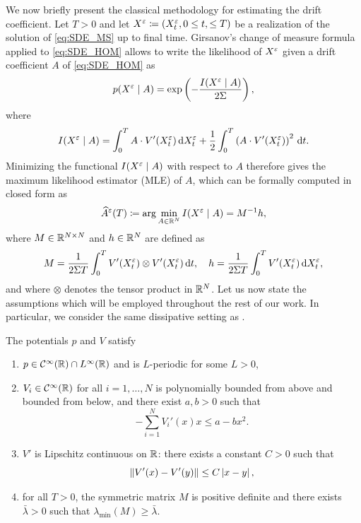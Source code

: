 \documentclass[10pt]{article}
\begin{document}
We now briefly present the classical methodology for estimating the drift coefficient. Let $T > 0$ and let $X^\varepsilon \coloneqq (X^\varepsilon_t, 0\leq t, \leq T)$ be a realization of the solution of \eqref{eq:SDE_MS} up to final time. Girsanov's change of measure formula applied to \eqref{eq:SDE_HOM} allows to write the likelihood of $X^\varepsilon$ given a drift coefficient $A$ of \eqref{eq:SDE_HOM} as
\begin{equation}\label{eq:Likelihood}
p(X^\varepsilon \mid A) = \exp\left(-\frac{I(X^\varepsilon\mid A)}{2\Sigma} \right), 
\end{equation}
where 
\begin{equation}
I(X^\varepsilon \mid A) = \int_0^T A \cdot V'(X^\varepsilon_t) \,\mathrm{d} X^\varepsilon_t + \frac12 \int_0^T \left( A \cdot V'(X^\varepsilon_t) \right)^2 \,\mathrm{d} t.
\end{equation}
Minimizing the functional $I(X^\varepsilon \mid A)$ with respect to $A$ therefore gives the maximum likelihood estimator (MLE) of $A$, which can be formally computed in closed form as
\begin{equation}\label{eq:MLE}
	\widehat A^\varepsilon(T) \coloneqq \arg \min_{A \in \mathbb{R}^N} I(X^\varepsilon \mid A) = M^{-1}h,
\end{equation}
where $M\in\mathbb{R}^{N\times N}$ and $h\in\mathbb{R}^N$ are defined as
\begin{equation}\label{eq:MandH}
M = \frac1{2\Sigma T} \int_0^T V'(X^\varepsilon_t) \otimes V'(X^\varepsilon_t) \,\mathrm{d} t, \quad h = \frac1{2\Sigma T} \int_0^T V'(X^\varepsilon_t) \,\mathrm{d} X^\varepsilon_t,
\end{equation}
and where $\otimes$ denotes the tensor product in $\mathbb{R}^N$.
Let us now state the assumptions which will be employed throughout the rest of our work. In particular, we consider the same dissipative setting as \cite[Assumption 3.1]{PaS07}.
\begin{assumption}\label{as:regularity} The potentials $p$ and $V$ satisfy
	\begin{enumerate}
		\item $p \in \mathcal C^\infty(\mathbb{R}) \cap L^\infty(\mathbb{R})$ and is $L$-periodic for some $L > 0$,
		\item\label{as:regularity_diss} $V_i \in \mathcal C^\infty(\mathbb{R})$ for all $i=1, \ldots, N$ is polynomially bounded from above and bounded from below, and there exist $a,b > 0$ such that
		\begin{equation}
		-\sum_{i=1}^N V_i'(x)x \leq a - bx^2.
		\end{equation} 
		\item $V'$ is Lipschitz continuous on $\mathbb{R}$: there exists a constant $C > 0$ such that
		\begin{equation}
			\left\|V'(x) - V'(y)\right\| \leq C\left\lvert x - y\right\rvert,
		\end{equation} 
		\item for all $T > 0$, the symmetric matrix $M$ is positive definite and there exists $\bar \lambda > 0$ such that $\lambda_{\min}(M) \geq \bar \lambda$.
	\end{enumerate}
\end{assumption}
\end{document}
